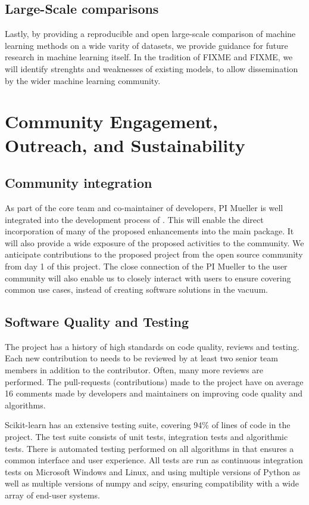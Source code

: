 \subsection{Large-Scale comparisons}
Lastly, by providing a reproducible and open large-scale comparison of machine learning
methods on a wide varity of datasets, we provide guidance for future research
in machine learning itself.
In the tradition of FIXME and FIXME, we will identify strenghts and weaknesses of existing
models, to allow dissemination by the wider machine learning community.

\section{Community Engagement, Outreach, and Sustainability}
\subsection{Community integration}
As part of the core team and co-maintainer of \sklearn{} developers, PI
Mueller is well integrated into the development process of \sklearn{}.
This will enable the direct incorporation of many of the proposed enhancements
into the \sklearn{} main package.
It will also provide a wide exposure of the proposed activities to the
\sklearn{} community. We anticipate contributions to the proposed
project from the open source community from day 1 of this project.
The close connection of the PI Mueller to the \sklearn{} user community will
also enable us to closely interact with users to ensure covering common use cases,
instead of creating software solutions in the vacuum.

\subsection{Software Quality and Testing}
The \sklearn{} project has a history of high standards on code quality, reviews and testing.
Each new contribution to \sklearn{} needs to be reviewed by at least two senior team members
in addition to the contributor. Often, many more reviews are performed. The
pull-requests (contributions) made to the project have on average 16 comments
made by developers and maintainers on improving code quality and algorithms.

Scikit-learn has an extensive testing suite, covering 94\% of lines of code in the project.
The test suite consists of unit tests, integration tests and algorithmic tests.
There is automated testing performed on all algorithms in \sklearn{} that ensures a common
interface and user experience.
All tests are run as continuous integration tests on Microsoft Windows and Linux, and using
multiple versions of Python as well as multiple versions of numpy and scipy, ensuring
compatibility with a wide array of end-user systems.


